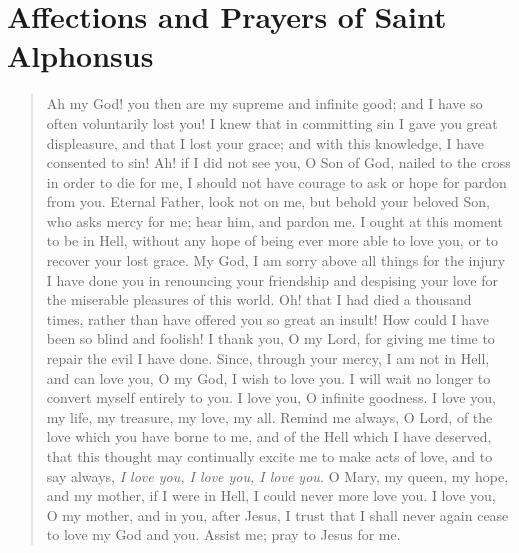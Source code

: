 \section{Affections and Prayers of Saint Alphonsus}

\begin{quote}
Ah my God! you then are my supreme and infinite good; and I have so often voluntarily lost you! I knew that in committing sin I gave you great displeasure, and that I lost your grace; and with this knowledge, I have consented to sin! Ah! if I did not see you, O Son of God, nailed to the cross in order to die for me, I should not have courage to ask or hope for pardon from you. Eternal Father, look not on me, but behold your beloved Son, who asks mercy for me; hear him, and pardon me. I ought at this moment to be in Hell, without any hope of being ever more able to love you, or to recover your lost grace. My God, I am sorry above all things for the injury I have done you in renouncing your friendship and despising your love for the miserable pleasures of this world. Oh! that I had died a thousand times, rather than have offered you so great an insult! \ifdefined\TriptychPrintEdition\pagebreak\else\fi How could I have been so blind and foolish! I thank you, O my Lord, for giving me time to repair the evil I have done. Since, through your mercy, I am not in Hell, and can love you, O my God, I wish to love you. I will wait no longer to convert myself entirely to you. I love you, O infinite goodness. I love you, my life, my treasure, my love, my all. Remind me always, O Lord, of the love which you have borne to me, and of the Hell which I have deserved, that this thought may continually excite me to make acts of love, and to say always, \emph{I love you, I love you, I love you.} O Mary, my queen, my hope, and my mother, if I were in Hell, I could never more love you. I love you, O my mother, and in you, after Jesus, I trust that I shall never again cease to love my God and you. Assist me; pray to Jesus for me.
\end{quote}
